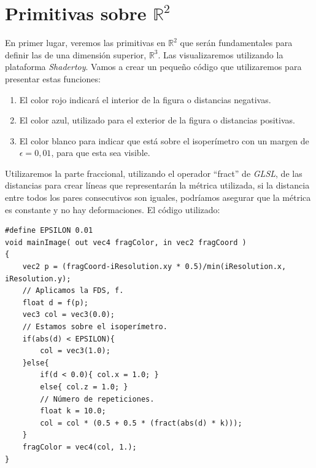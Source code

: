 \section{Primitivas sobre \(\mathbb{R}^2\)}
En primer lugar, veremos las primitivas en \(\mathbb{R}^2\) que serán fundamentales para definir las de una dimensión superior, \(\mathbb{R}^3\). Las visualizaremos utilizando la plataforma \textit{Shadertoy}. Vamos a crear un pequeño código que utilizaremos para presentar estas funciones:
\begin{enumerate}
    \item El color rojo indicará el interior de la figura o distancias negativas.
    \item El color azul, utilizado para el exterior de la figura o distancias positivas.
    \item El color blanco para indicar que está sobre el isoperímetro con un margen de \(\epsilon=0,01\), para que esta sea visible.
\end{enumerate}
Utilizaremos la parte fraccional, utilizando el operador \enquote{fract} de \textit{GLSL}, de las distancias para crear líneas que representarán la métrica utilizada, si la distancia entre todos los pares consecutivos son iguales, podríamos asegurar que la métrica es constante y no hay deformaciones. El código utilizado:
\begin{lstlisting}
#define EPSILON 0.01
void mainImage( out vec4 fragColor, in vec2 fragCoord )
{
    vec2 p = (fragCoord-iResolution.xy * 0.5)/min(iResolution.x, iResolution.y);
    // Aplicamos la FDS, f.
    float d = f(p);
    vec3 col = vec3(0.0);
    // Estamos sobre el isoperímetro.
    if(abs(d) < EPSILON){
        col = vec3(1.0);
    }else{
        if(d < 0.0){ col.x = 1.0; }
        else{ col.z = 1.0; }
    	// Número de repeticiones.
        float k = 10.0;
        col = col * (0.5 + 0.5 * (fract(abs(d) * k)));
    }
    fragColor = vec4(col, 1.);
}
\end{lstlisting}

